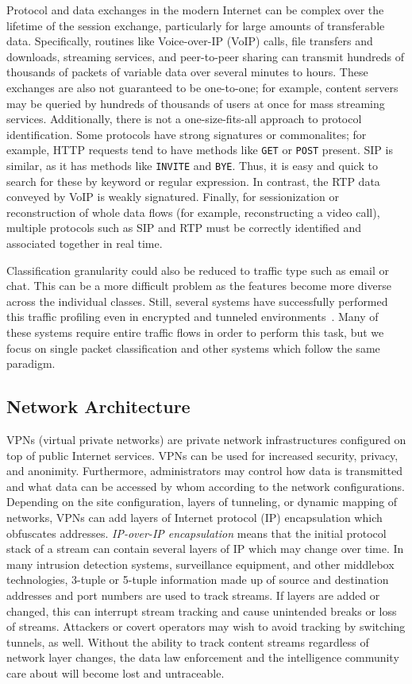 Protocol and data exchanges in the modern Internet can be complex over the lifetime of the session exchange, particularly for large amounts of transferable data. Specifically, routines like Voice-over-IP (VoIP) calls, file transfers and downloads, streaming services, and peer-to-peer sharing can transmit hundreds of thousands of packets of variable data over several minutes to hours. These exchanges are also not guaranteed to be one-to-one; for example, content servers may be queried by hundreds of thousands of users at once for mass streaming services. Additionally, there is not a one-size-fits-all approach to protocol identification. Some protocols have strong signatures or commonalites; for example, HTTP requests tend to have methods like \texttt{GET} or \texttt{POST} present. SIP is similar, as it has methods like \texttt{INVITE} and \texttt{BYE}. Thus, it is easy and quick to search for these by keyword or regular expression. In contrast, the RTP data conveyed by VoIP is weakly signatured. Finally, for sessionization or reconstruction of whole data flows (for example, reconstructing a video call), multiple protocols such as SIP and RTP must be correctly identified and associated together in real time.

Classification granularity could also be reduced to traffic type such as email or chat. This can be a more difficult problem as the features become more diverse across the individual classes. Still, several systems have successfully performed this traffic profiling even in encrypted and tunneled environments~\cite{iscx-tor-paper, iscx-vpn-paper, deeppacket, didarknet}. Many of these systems require entire traffic flows in order to perform this task, but we focus on single packet classification and other systems which follow the same paradigm.

\subsection{Network Architecture}

VPNs (virtual private networks) are private network infrastructures configured on top of public Internet services. VPNs can be used for increased security, privacy, and anonimity. Furthermore, administrators may control how data is transmitted and what data can be accessed by whom according to the network configurations. Depending on the site configuration, layers of tunneling, or dynamic mapping of networks, VPNs can add layers of Internet protocol (IP) encapsulation which obfuscates addresses. \textit{IP-over-IP encapsulation} means that the initial protocol stack of a stream can contain several layers of IP which may change over time. In many intrusion detection systems, surveillance equipment, and other middlebox technologies, 3-tuple or 5-tuple information made up of source and destination addresses and port numbers are used to track streams. If layers are added or changed, this can interrupt stream tracking and cause unintended breaks or loss of streams. Attackers or covert operators may wish to avoid tracking by switching tunnels, as well. Without the ability to track content streams regardless of network layer changes, the data law enforcement and the intelligence community care about will become lost and untraceable.

